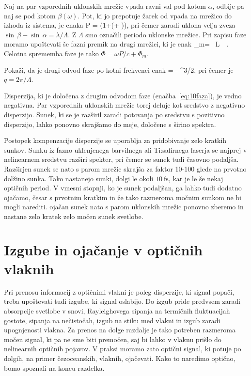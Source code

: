 Naj na par vzporednih uklonskih mrežic vpada ravni val pod kotom $\alpha$, odbije
pa naj se pod kotom $\beta(\omega)$. Pot, ki jo prepotuje žarek od vpada na mrežico 
do izhoda iz sistema, je enaka 
\beq
P =  \left(1+\cos(\alpha + \beta)\right),
\eeq
pri čemer zaradi uklona velja zveza $\sin\,\beta - \sin\,\alpha = \lambda/\Lambda$.
Z $\Lambda$ smo označili periodo uklonske mrežice. 
Pri zapisu faze moramo upoštevati še fazni premik na drugi mrežici, ki je enak
\beq
\Phi_m=\frac{2\pi}{\Lambda} \, L \, \tan\,\beta.
\eeq
Celotna sprememba faze je tako $\Phi = \omega P/c + \Phi_m$.

\begin{definition}
Pokaži, da je drugi odvod faze po kotni frekvenci enak
\beq
{} = - 
{^{3/2}},
\label{eq:10faza}
\eeq
pri čemer je $q = 2 \pi/\Lambda$.
\end{definition}
Disperzija, ki je določena z drugim odvodom faze (enačba~\ref{eq:10faza}),
je vedno negativna. Par vzporednih uklonskih mrežic torej deluje kot sredstvo
z negativno disperzijo. Sunek, ki se je razširil zaradi potovanja
po sredstvu s pozitivno disperzijo, lahko ponovno skrajšamo do meje,
določene s širino spektra. 

\begin{remark}
Postopek kompenzacije disperzije se uporablja za pridobivanje zelo 
kratkih sunkov. Sunku iz fazno uklenjenega barvilnega ali Ti:safirnega
laserja se najprej v nelinearnem sredstvu razširi spekter, pri čemer
se sunek tudi časovno podaljša. Razširjen sunek se nato s parom mrežic skrajša
za faktor 10-100 glede na prvotno dolžino sunka. Tako nastanejo sunki,
dolgi le okoli $10~\si{\femto\second}$, kar je le še nekaj optičnih period. 
V vmesni stopnji, ko je sunek podaljšan, ga lahko tudi dodatno ojačamo, česar
s prvotnim kratkim in že tako razmeroma močnim sunkom ne bi mogli narediti. ojačan
sunek nato s parom uklonskih mrežic ponovno zberemo in nastane zelo kratek
zelo močen sunek svetlobe.
\end{remark}


\section{Izgube in ojačanje v optičnih vlaknih}
Pri prenosu informacij z optičnimi vlakni je poleg disperzije, ki signal popači,
treba upoštevati tudi izgube, ki signal oslabijo. 
Do izgub pride predvsem zaradi absorpcije svetlobe v snovi,
Rayleighovega sipanja na termičnih fluktuacijah gostote, sipanja na nečistočah, 
izgub na stiku med vlakni in izgub zaradi upognjenosti vlakna. Za prenos na dolge
razdalje je tako potreben razmeroma močen signal, ki pa ne sme biti premočen,
saj bi lahko v vlaknu prišlo do nelinearnih optičnih pojavov. V praksi moramo zato 
optični signal, ki potuje po dolgih, na primer čezoceanskih, vlaknih, ojačevati. 
Kako to naredimo optično, bomo spoznali na koncu razdelka.

